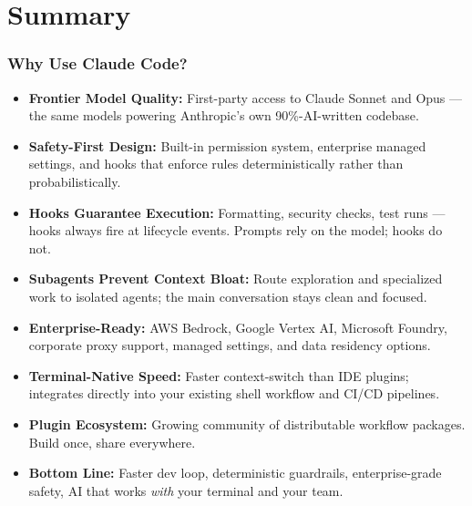 \section{Summary}
\begin{frame}[fragile]\frametitle{Why Use Claude Code?}
  \begin{itemize}
    \item \textbf{Frontier Model Quality:} First-party access to Claude Sonnet and Opus --- the same models powering Anthropic's own 90\%-AI-written codebase.
    \item \textbf{Safety-First Design:} Built-in permission system, enterprise managed settings, and hooks that enforce rules deterministically rather than probabilistically.
    \item \textbf{Hooks Guarantee Execution:} Formatting, security checks, test runs --- hooks always fire at lifecycle events. Prompts rely on the model; hooks do not.
    \item \textbf{Subagents Prevent Context Bloat:} Route exploration and specialized work to isolated agents; the main conversation stays clean and focused.
    \item \textbf{Enterprise-Ready:} AWS Bedrock, Google Vertex AI, Microsoft Foundry, corporate proxy support, managed settings, and data residency options.
    \item \textbf{Terminal-Native Speed:} Faster context-switch than IDE plugins; integrates directly into your existing shell workflow and CI/CD pipelines.
    \item \textbf{Plugin Ecosystem:} Growing community of distributable workflow packages. Build once, share everywhere.
    \item \textbf{Bottom Line:} Faster dev loop, deterministic guardrails, enterprise-grade safety, AI that works \textit{with} your terminal and your team.
  \end{itemize}
\end{frame}

